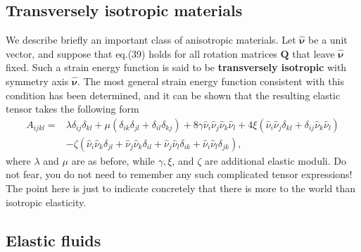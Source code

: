 \documentclass [a4paper,12pt]{paper}
\begin{document}
\subsection*{Transversely isotropic materials}

We describe briefly an important class of anisotropic materials. Let $\hat{\boldsymbol{\nu}}$ be a unit vector, 
and suppose that eq.(39) holds for all rotation matrices $\mathbf{Q}$ that leave $\hat{\boldsymbol{\nu}}$ fixed. Such a 
strain energy function is said to be \textbf{transversely isotropic} with symmetry axis $\hat{\boldsymbol{\nu}}$. The most general 
strain energy function consistent with this condition has been determined, and it can be shown that the resulting elastic tensor 
takes the following form
\begin{equation}
\begin{split}
A_{ijkl} = &\lambda\delta_{ij}\delta_{kl} + \mu(\delta_{ik}\delta_{jl} + \delta_{il}\delta_{kj}) + 8\gamma\hat{\nu}_{i}\hat{\nu}_{j}\hat{\nu}_{k}\hat{\nu}_{l} + 4\xi(\hat{\nu}_{i}\hat{\nu}_{j}\delta_{kl} + \delta_{ij}\hat{\nu}_{k}\hat{\nu}_{l}) \\
&-\zeta(\hat{\nu}_{i}\hat{\nu}_{k}\delta_{jl} + \hat{\nu}_{j}\hat{\nu}_{k}\delta_{il} + \hat{\nu}_{j}\hat{\nu}_{l}\delta_{ik} + \hat{\nu}_{i}\hat{\nu}_{l}\delta_{jk}),
\end{split}
\end{equation}
where $\lambda$ and $\mu$ are as before, while $\gamma, \xi$, and $\zeta$ are additional elastic moduli. Do not fear, 
you do not need to remember any such complicated tensor expressions! The point here is just to indicate concretely that 
there is more to the world than isotropic elasticity.

\subsection*{Elastic fluids}
\end{document}
